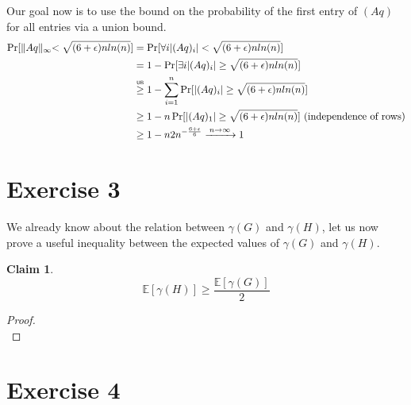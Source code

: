 \documentclass[a4paper,german]{article}
\newcommand\gequb{\mathrel{\overset{\makebox[0pt]{\mbox{\normalfont\tiny\sffamily UB}}}{\geq}}}
\newtheorem{claim}{Claim}
\newcommand{\E}{\mathbb{E}}
\begin{document}
Our goal now is to use the bound on the probability of the first entry of \( (Aq) \) for all entries via a union bound.
\begin{align*}
\Pr[ \lVert Aq \lVert_{\infty} < \sqrt {(6+\epsilon)nln(n)}] &= \Pr[ \forall i  |(Aq)_i|  < \sqrt {(6+\epsilon)nln(n)}] \\
&= 1 - \Pr[ \exists i  |(Aq)_i|  \geq \sqrt {(6+\epsilon)nln(n)}] \\
&\gequb 1 - \sum_{i=1}^n \Pr[|(Aq)_i|  \geq \sqrt {(6+\epsilon)nln(n)}] \\
&\geq 1 - n \Pr[|(Aq)_1|  \geq \sqrt {(6+\epsilon)nln(n)}] \text{     (independence of rows)}\\
&\geq 1 - n 2 n^{-\frac{6+\epsilon}{6}}  \xrightarrow{\: n \to \infty \: } 1
\end{align*}
\section*{Exercise 3}

We already know about the relation between \(\gamma(G)\) and \( \gamma(H)\), let us now prove a useful inequality between the expected values of \(\gamma(G)\) and \( \gamma(H)\). 
\begin{claim}
\[ \E[\gamma(H)] \geq \frac{\E[\gamma(G)]}{2} \]
\end{claim}
\begin{proof}
\[ \]
\end{proof}
\section*{Exercise 4}
\end{document}
